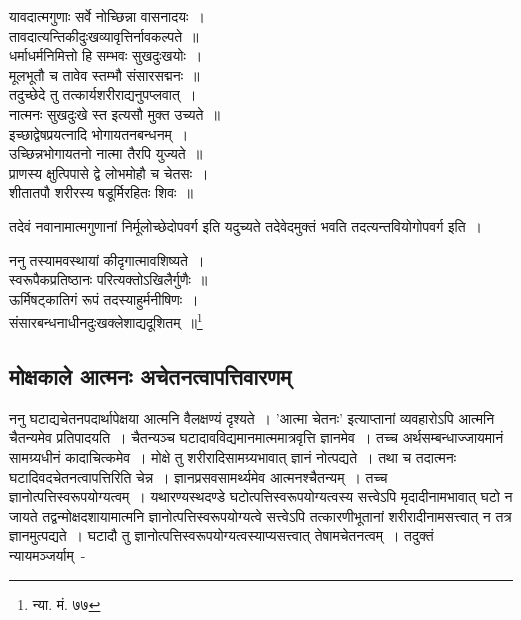 		{\fontsize{11.7}{0}\selectfont\s \begin{center}यावदात्मगुणाः सर्वे नोच्छिन्ना वासनादयः~।\\ तावदात्यन्तिकीदुःखव्यावृत्तिर्नावकल्पते~॥\\ धर्माधर्मनिमित्तो हि सम्भवः सुखदुःखयोः~।\\ मूलभूतौ च तावेव स्तम्भौ संसारसद्मनः~॥\\ तदुच्छेदे तु तत्कार्यशरीराद्यनुपप्लवात्~।\\ नात्मनः सुखदुःखे स्त इत्यसौ मुक्त उच्यते~॥\\ इच्छाद्वेषप्रयत्नादि भोगायतनबन्धनम्~।\\ उच्छिन्नभोगायतनो नात्मा तैरपि युज्यते~॥\\ प्राणस्य क्षुत्पिपासे द्वे लोभमोहौ च चेतसः~।\\ शीतातपौ शरीरस्य षडूर्मिरहितः शिवः~॥\end{center}}

		{\fontsize{11.7}{0}\selectfont\s तदेवं नवानामात्मगुणानां निर्मूलोच्छेदोपवर्ग इति यदुच्यते तदेवेदमुक्तं भवति तदत्यन्तवियोगोपवर्ग इति~।}

		{\fontsize{11.7}{0}\selectfont\s \begin{center}ननु तस्यामवस्थायां कीदृगात्मावशिष्यते~।\\ स्वरूपैकप्रतिष्ठानः परित्यक्तोऽखिलैर्गुणैः~॥\\ ऊर्मिषट्कातिगं रूपं तदस्याहुर्मनीषिणः~।\\ संसारबन्धनाधीनदुःखक्लेशाद्यदूशितम्~॥\footnote{न्या. मं. ७७}\end{center}}

		\subsection{मोक्षकाले आत्मनः अचेतनत्वापत्तिवारणम्}

		ननु घटाद्यचेतनपदार्थापेक्षया आत्मनि वैलक्षण्यं दृश्यते~। 'आत्मा चेतनः' इत्याप्तानां व्यवहारोऽपि आत्मनि चैतन्यमेव प्रतिपादयति~। चैतन्यञ्च घटादावविद्यमानमात्ममात्रवृत्ति ज्ञानमेव~। तच्च अर्थसम्बन्धाज्जायमानं सामग्र्यधीनं कादाचित्कमेव~। मोक्षे तु शरीरादिसामग्र्यभावात् ज्ञानं नोत्पद्यते~। तथा च तदात्मनः घटादिवदचेतनत्वापत्तिरिति चेन्न~। ज्ञानप्रसवसामर्थ्यमेव आत्मनश्चैतन्यम्~। तच्च ज्ञानोत्पत्तिस्वरूपयोग्यत्वम्~। यथारण्यस्थदण्डे घटोत्पत्तिस्वरूपयोग्यत्वस्य सत्त्वेऽपि मृदादीनामभावात् घटो न जायते तद्वन्मोक्षदशायामात्मनि ज्ञानोत्पत्तिस्वरूपयोग्यत्वे सत्त्वेऽपि तत्कारणीभूतानां शरीरादीनामसत्त्वात् न तत्र ज्ञानमुत्पद्यते~। घटादौ तु ज्ञानोत्पत्तिस्वरूपयोग्यत्वस्याप्यसत्त्वात् तेषामचेतनत्वम्~। तदुक्तं न्यायमञ्जर्याम्~-

